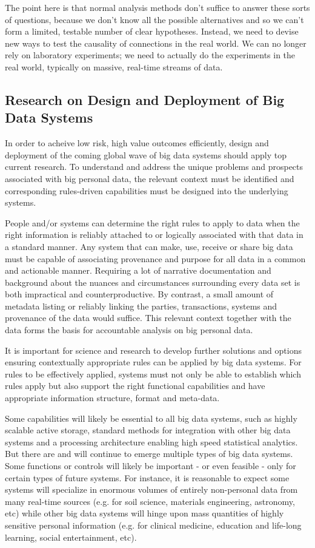 The point here is that normal analysis methods don't suffice to answer these sorts of questions, because we don’t know all the possible alternatives and so we can’t form a limited, testable number of clear hypotheses. Instead, we need to devise new ways to test the causality of connections in the real world. We can no longer rely on laboratory experiments; we need to actually do the experiments in the real world, typically on massive, real-time streams of data.

\subsection{Research on Design and Deployment of Big Data Systems}

In order to acheive low risk, high value outcomes efficiently, design and deployment of the coming global wave of big data systems should apply top current research. To understand and address the unique problems and prospects associated with big personal data, the relevant context must be identified and corresponding rules-driven capabilities must be designed into the underlying systems.

People and/or systems can determine the right rules to apply to data when the right information is reliably attached to or logically associated with that data in a standard manner. Any system that can make, use, receive or share big data must be capable of associating provenance and purpose for all data in a common and actionable manner. Requiring a lot of narrative documentation and background about the nuances and circumstances surrounding every data set is both impractical and counterproductive. By contrast, a small amount of metadata listing or reliably linking the parties, transactions, systems and provenance of the data would suffice. This relevant context together with the data forms the basis for accountable analysis on big personal data.

It is important for science and research to develop further solutions and options ensuring contextually appropriate rules can be applied by big data systems. For rules to be effectively applied, systems must not only be able to establish which rules apply but also support the right functional capabilities and have appropriate information structure, format and meta-data.

Some capabilities will likely be essential to all big data systems, such as highly scalable active storage, standard methods for integration with other big data systems and a processing architecture enabling high speed statistical analytics. But there are and will continue to emerge multiple types of big data systems. Some functions or controls will likely be important - or even feasible - only for certain types of future systems. For instance, it is reasonable to expect some systems will specialize in enormous volumes of entirely non-personal data from many real-time sources (e.g. for soil science, materials engineering, astronomy, etc) while other big data systems will hinge upon mass quantities of highly sensitive personal information (e.g. for clinical medicine, education and life-long learning, social entertainment, etc).

